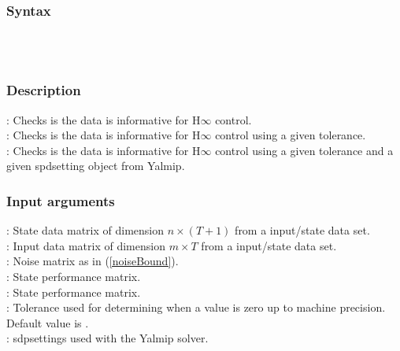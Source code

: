 \subsubsection*{Syntax} 
 \\
 \\

\subsubsection*{Description}
\mon{[[bool, K, diagnostics, gamma, info] = isInformHInf(X, U, Phi, C, D)}: Checks is the data is informative for \mbox{H$\infty$} control. \\
: Checks is the data is informative for \mbox{H$\infty$} control using a given tolerance. \\
: Checks is the data is informative for \mbox{H$\infty$} control using a given tolerance and a given spdsetting object from Yalmip.

\subsubsection*{Input arguments}
\textbf{}: State data matrix of dimension $n \times (T+1)$ from a input/state data set.\\
\textbf{}: Input data matrix of dimension $m \times T$ from a input/state data set.\\
\textbf{}: Noise matrix as in (\ref{noiseBound}). \\ 
\textbf{}: State performance matrix. \\ 
\textbf{}: State performance matrix. \\ 
\textbf{}: Tolerance used for determining when a value is zero up to machine precision. Default value is .\\
\textbf{}: sdpsettings used with the Yalmip solver.

